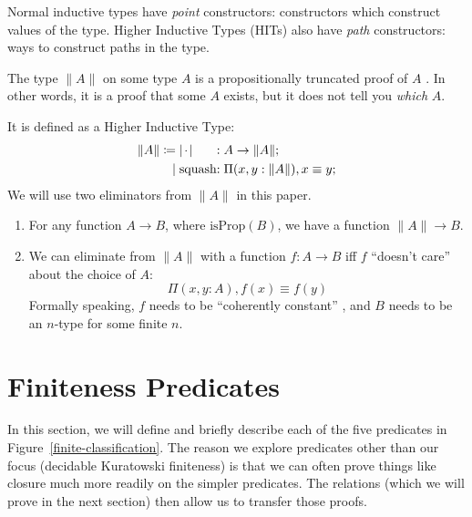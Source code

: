 \begin{definition} \label{HITs}
  Normal inductive types have \emph{point} constructors: constructors which
  construct values of the type.
  Higher Inductive Types (HITs) also have \emph{path} constructors: ways to
  construct paths in the type.
\end{definition}
\begin{definition} \label{prop-trunc}
  The type \(\lVert A \rVert\) on some type \(A\) is a propositionally truncated
  proof of \(A\) \cite[3.7]{hottbook}.
  In other words, it is a proof that some \(A\) exists, but it does not tell you
  \emph{which} \(A\).

  It is defined as a Higher Inductive Type:
  \begin{equation} {
    \begin{alignedat}{3}
      \lVert A \rVert \coloneqq & \; \lvert {\mkern 2mu\cdot\mkern 2mu}\rvert &:& \; A \rightarrow \lVert A \rVert ; \\
                              | & \; \text{squash}     &:& \; \Pi {(x, y : \lVert A \rVert)} , x \equiv y  ; 
    \end{alignedat} }
  \end{equation}
  We will use two eliminators from \(\lVert A \rVert\) in this paper.
  \begin{enumerate}
  \item \label{elim-prop-prop} For any function \(A \rightarrow B\), where
    \(\text{isProp}(B)\), we have a function \(\lVert A \rVert \rightarrow B\).
  \item \label{elim-prop-coh} We can eliminate from \(\lVert A \rVert\) with a
    function \(f : A \rightarrow B\) iff \(f\) ``doesn't care'' about the
    choice of \(A\):
    \[\Pi {(x , y : A)} , f(x) \equiv f(y) \]
    Formally speaking, \(f\) needs to be ``coherently constant''
    \cite{krausGeneralUniversalProperty2015}, and \(B\) needs to be an
    \(n\)-type for some finite \(n\).
  \end{enumerate}
\end{definition}
\section{Finiteness Predicates} \label{finiteness-predicates}
In this section, we will define and briefly describe each of the five predicates
in Figure~\ref{finite-classification}.
The reason we explore predicates other than our focus (decidable Kuratowski
finiteness) is that we can often prove things like closure much more readily on
the simpler predicates.
The relations (which we will prove in the next section) then allow us to
transfer those proofs.
